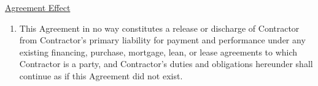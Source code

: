 \underline{Agreement Effect}
\begin{enumerate}
    \item This Agreement in no way constitutes a release or discharge of
    Contractor from Contractor's primary liability for payment and
    performance under any existing financing, purchase, mortgage, lean, or
    lease agreements to which Contractor is a party, and Contractor's
    duties and obligations hereunder shall continue as if this Agreement
    did not exist.
\end{enumerate}